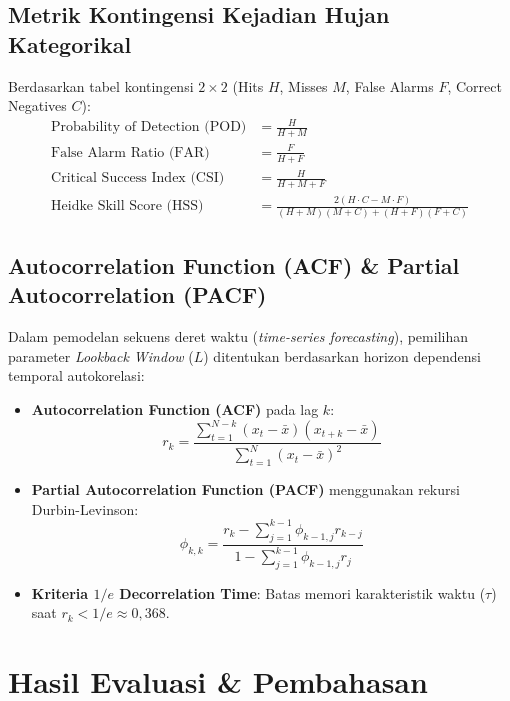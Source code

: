 \documentclass[11pt,a4paper]{article}
\begin{document}
\subsection{Metrik Kontingensi Kejadian Hujan Kategorikal}
Berdasarkan tabel kontingensi $2 \times 2$ (Hits $H$, Misses $M$, False Alarms $F$, Correct Negatives $C$):
\begin{align}
    \text{Probability of Detection (POD)} &= \frac{H}{H + M} \\
    \text{False Alarm Ratio (FAR)} &= \frac{F}{H + F} \\
    \text{Critical Success Index (CSI)} &= \frac{H}{H + M + F} \\
    \text{Heidke Skill Score (HSS)} &= \frac{2(H \cdot C - M \cdot F)}{(H + M)(M + C) + (H + F)(F + C)}
\end{align}

\subsection{Autocorrelation Function (ACF) \& Partial Autocorrelation (PACF)}
Dalam pemodelan sekuens deret waktu (\textit{time-series forecasting}), pemilihan parameter \textit{Lookback Window} ($L$) ditentukan berdasarkan horizon dependensi temporal autokorelasi:
\begin{itemize}[leftmargin=*]
    \item \textbf{Autocorrelation Function (ACF)} pada lag $k$:
    \begin{equation}
        r_k = \frac{\sum_{t=1}^{N-k} (x_t - \bar{x})(x_{t+k} - \bar{x})}{\sum_{t=1}^N (x_t - \bar{x})^2}
    \end{equation}
    \item \textbf{Partial Autocorrelation Function (PACF)} menggunakan rekursi Durbin-Levinson:
    \begin{equation}
        \phi_{k,k} = \frac{r_k - \sum_{j=1}^{k-1} \phi_{k-1,j} r_{k-j}}{1 - \sum_{j=1}^{k-1} \phi_{k-1,j} r_j}
    \end{equation}
    \item \textbf{Kriteria $1/e$ Decorrelation Time}: Batas memori karakteristik waktu ($\tau$) saat $r_k < 1/e \approx 0{,}368$.
\end{itemize}

\FloatBarrier

\section{Hasil Evaluasi \& Pembahasan}
\end{document}
